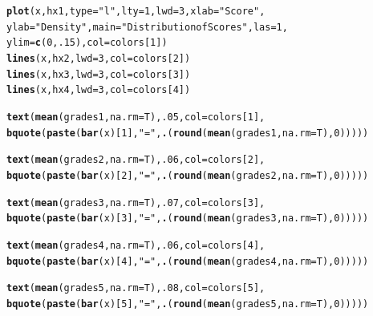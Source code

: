 \documentclass{article}\usepackage[]{graphicx}\usepackage[]{color}
\makeatletter
\newcommand{\hlnum}[1]{\textcolor[rgb]{0.686,0.059,0.569}{#1}}%
\newcommand{\hlstr}[1]{\textcolor[rgb]{0.192,0.494,0.8}{#1}}%
\newcommand{\hlstd}[1]{\textcolor[rgb]{0.345,0.345,0.345}{#1}}%
\newcommand{\hlkwc}[1]{\textcolor[rgb]{0.333,0.667,0.333}{#1}}%
\newcommand{\hlkwd}[1]{\textcolor[rgb]{0.737,0.353,0.396}{\textbf{#1}}}%
\newenvironment{kframe}{%
 \def\at@end@of@kframe{}%
 \ifinner\ifhmode%
  \def\at@end@of@kframe{\end{minipage}}%
  \begin{minipage}{\columnwidth}%
 \fi\fi%
 \def\FrameCommand##1{\hskip\@totalleftmargin \hskip-\fboxsep
 \colorbox{shadecolor}{##1}\hskip-\fboxsep
     \hskip-\linewidth \hskip-\@totalleftmargin \hskip\columnwidth}%
 \MakeFramed {\advance\hsize-\width
   \@totalleftmargin\z@ \linewidth\hsize
   \@setminipage}}%
 {\par\unskip\endMakeFramed%
 \at@end@of@kframe}
\newenvironment{knitrout}{}{} %
\makeatother
\begin{document}
\begin{knitrout}
\begin{kframe}
\begin{alltt}
\hlkwd{plot}\hlstd{(x, hx1,} \hlkwc{type}\hlstd{=}\hlstr{"l"}\hlstd{,} \hlkwc{lty}\hlstd{=}\hlnum{1}\hlstd{,} \hlkwc{lwd}\hlstd{=}\hlnum{3}\hlstd{,} \hlkwc{xlab}\hlstd{=}\hlstr{"Score"}\hlstd{,}
  \hlkwc{ylab}\hlstd{=}\hlstr{"Density"}\hlstd{,} \hlkwc{main}\hlstd{=}\hlstr{"Distribution of Scores"}\hlstd{,} \hlkwc{las}\hlstd{=}\hlnum{1}\hlstd{,}
  \hlkwc{ylim}\hlstd{=}\hlkwd{c}\hlstd{(}\hlnum{0}\hlstd{,}\hlnum{.15}\hlstd{),} \hlkwc{col}\hlstd{=colors[}\hlnum{1}\hlstd{])}
  \hlkwd{lines}\hlstd{(x, hx2,} \hlkwc{lwd}\hlstd{=}\hlnum{3}\hlstd{,} \hlkwc{col}\hlstd{=colors[}\hlnum{2}\hlstd{])}
  \hlkwd{lines}\hlstd{(x, hx3,} \hlkwc{lwd}\hlstd{=}\hlnum{3}\hlstd{,} \hlkwc{col}\hlstd{=colors[}\hlnum{3}\hlstd{])}
  \hlkwd{lines}\hlstd{(x, hx4,} \hlkwc{lwd}\hlstd{=}\hlnum{3}\hlstd{,} \hlkwc{col}\hlstd{=colors[}\hlnum{4}\hlstd{])}

\hlkwd{text}\hlstd{(}\hlkwd{mean}\hlstd{(grades1,} \hlkwc{na.rm}\hlstd{=T),} \hlnum{.05}\hlstd{,} \hlkwc{col}\hlstd{=colors[}\hlnum{1}\hlstd{],}
     \hlkwd{bquote}\hlstd{(}\hlkwd{paste}\hlstd{(}\hlkwd{bar}\hlstd{(x)[}\hlnum{1}\hlstd{],} \hlstr{" = "}\hlstd{,} \hlkwd{.}\hlstd{(}\hlkwd{round}\hlstd{(}\hlkwd{mean}\hlstd{(grades1,} \hlkwc{na.rm}\hlstd{=T),} \hlnum{0}\hlstd{)))))}

\hlkwd{text}\hlstd{(}\hlkwd{mean}\hlstd{(grades2,} \hlkwc{na.rm}\hlstd{=T),} \hlnum{.06}\hlstd{,} \hlkwc{col}\hlstd{=colors[}\hlnum{2}\hlstd{],}
     \hlkwd{bquote}\hlstd{(}\hlkwd{paste}\hlstd{(}\hlkwd{bar}\hlstd{(x)[}\hlnum{2}\hlstd{],} \hlstr{" = "}\hlstd{,} \hlkwd{.}\hlstd{(}\hlkwd{round}\hlstd{(}\hlkwd{mean}\hlstd{(grades2,} \hlkwc{na.rm}\hlstd{=T),} \hlnum{0}\hlstd{)))))}

\hlkwd{text}\hlstd{(}\hlkwd{mean}\hlstd{(grades3,} \hlkwc{na.rm}\hlstd{=T),} \hlnum{.07}\hlstd{,} \hlkwc{col}\hlstd{=colors[}\hlnum{3}\hlstd{],}
     \hlkwd{bquote}\hlstd{(}\hlkwd{paste}\hlstd{(}\hlkwd{bar}\hlstd{(x)[}\hlnum{3}\hlstd{],} \hlstr{" = "}\hlstd{,} \hlkwd{.}\hlstd{(}\hlkwd{round}\hlstd{(}\hlkwd{mean}\hlstd{(grades3,} \hlkwc{na.rm}\hlstd{=T),} \hlnum{0}\hlstd{)))))}

\hlkwd{text}\hlstd{(}\hlkwd{mean}\hlstd{(grades4,} \hlkwc{na.rm}\hlstd{=T),} \hlnum{.06}\hlstd{,} \hlkwc{col}\hlstd{=colors[}\hlnum{4}\hlstd{],}
     \hlkwd{bquote}\hlstd{(}\hlkwd{paste}\hlstd{(}\hlkwd{bar}\hlstd{(x)[}\hlnum{4}\hlstd{],} \hlstr{" = "}\hlstd{,} \hlkwd{.}\hlstd{(}\hlkwd{round}\hlstd{(}\hlkwd{mean}\hlstd{(grades4,} \hlkwc{na.rm}\hlstd{=T),} \hlnum{0}\hlstd{)))))}

\hlkwd{text}\hlstd{(}\hlkwd{mean}\hlstd{(grades5,} \hlkwc{na.rm}\hlstd{=T),} \hlnum{.08}\hlstd{,} \hlkwc{col}\hlstd{=colors[}\hlnum{5}\hlstd{],}
     \hlkwd{bquote}\hlstd{(}\hlkwd{paste}\hlstd{(}\hlkwd{bar}\hlstd{(x)[}\hlnum{5}\hlstd{],} \hlstr{" = "}\hlstd{,} \hlkwd{.}\hlstd{(}\hlkwd{round}\hlstd{(}\hlkwd{mean}\hlstd{(grades5,} \hlkwc{na.rm}\hlstd{=T),} \hlnum{0}\hlstd{)))))}


\end{alltt}
\end{kframe}
\end{knitrout}
\end{document}
